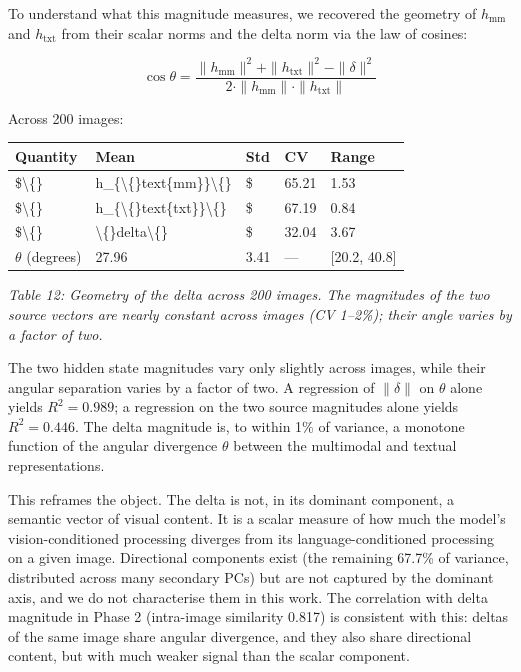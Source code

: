 \documentclass[11pt,a4paper]{article}
\begin{document}
To understand what this magnitude measures, we recovered the geometry of $h_{\text{mm}}$ and $h_{\text{txt}}$ from their scalar norms and the delta norm via the law of cosines:

\begin{equation*}
\cos \theta = \frac{\|h_{\text{mm}}\|^2 + \|h_{\text{txt}}\|^2 - \|\delta\|^2}{2 \cdot \|h_{\text{mm}}\| \cdot \|h_{\text{txt}}\|}
\end{equation*}

Across 200 images:

\begin{center}
\begin{tabular}{lllll}
\toprule
Quantity & Mean & Std & CV & Range \\
\midrule
\$\textbackslash\{\} & h\_\{\textbackslash\{\}text\{mm\}\}\textbackslash\{\} & \$ & 65.21 & 1.53 \\
\$\textbackslash\{\} & h\_\{\textbackslash\{\}text\{txt\}\}\textbackslash\{\} & \$ & 67.19 & 0.84 \\
\$\textbackslash\{\} & \textbackslash\{\}delta\textbackslash\{\} & \$ & 32.04 & 3.67 \\
$\theta$ (degrees) & 27.96\textdegree{} & 3.41\textdegree{} & --- & [20.2\textdegree{}, 40.8\textdegree{}] \\
\bottomrule
\end{tabular}
\end{center}

\emph{Table 12: Geometry of the delta across 200 images. The magnitudes of the two source vectors are nearly constant across images (CV 1--2\%); their angle varies by a factor of two.}

The two hidden state magnitudes vary only slightly across images, while their angular separation varies by a factor of two. A regression of $\|\delta\|$ on $\theta$ alone yields $R^2 = 0.989$; a regression on the two source magnitudes alone yields $R^2 = 0.446$. The delta magnitude is, to within 1\% of variance, a monotone function of the angular divergence $\theta$ between the multimodal and textual representations.

This reframes the object. The delta is not, in its dominant component, a semantic vector of visual content. It is a scalar measure of how much the model's vision-conditioned processing diverges from its language-conditioned processing on a given image. Directional components exist (the remaining 67.7\% of variance, distributed across many secondary PCs) but are not captured by the dominant axis, and we do not characterise them in this work. The correlation with delta magnitude in Phase 2 (intra-image similarity 0.817) is consistent with this: deltas of the same image share angular divergence, and they also share directional content, but with much weaker signal than the scalar component.
\end{document}
